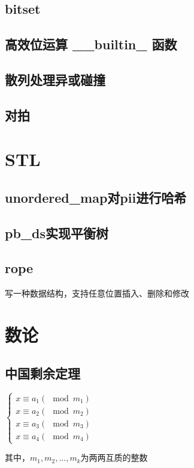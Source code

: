 \documentclass[landscape,twocolumn,twoside,a4paper]{article}
\begin{document}
\subsection{bitset}


\subsection{高效位运算 \_\_builtin\_ 函数}


\subsection{散列处理异或碰撞}


\subsection{对拍}



\section{STL}

\subsection{unordered\_map对pii进行哈希}


\subsection{pb\_ds实现平衡树}


\subsection{rope}
写一种数据结构，支持任意位置插入、删除和修改



\section{数论}

\subsection{中国剩余定理}
$\left\{\begin{matrix} x \equiv a_{1} (\mod m_{1})\\ x \equiv a_{2} (\mod m_{2})\\  x \equiv a_{3} (\mod m_{3})\\  x \equiv a_{4} (\mod m_{4})\end{matrix}\right.$ \par
其中，$m_1,m_2,...,m_k$为两两互质的整数

\end{document}
